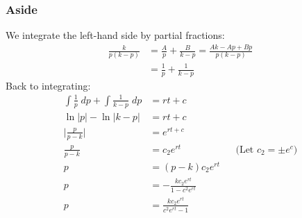 \documentclass{report}
\begin{document}
\subsubsection{Aside}
We integrate the left-hand side by partial fractions:
\begin{align*}
    \frac{k}{p(k-p)} &= \frac{A}{p} + \frac{B}{k-p} = \frac{Ak - Ap + Bp}{p(k-p)} \\
    &= \frac{1}{p} + \frac{1}{k-p}
\end{align*}
Back to integrating:
\begin{align}
    \int \frac{1}{p} \; dp + \int \frac{1}{k-p} \; dp &= rt + c \\
    \ln |p| - \ln |k - p| &= rt + c \\
    \biggl\lvert\frac{p}{p-k}\biggr\rvert &= e^{rt + c} \\
    \frac{p}{p-k} &= c_2e^{rt} && \text{(Let }c_2 = \pm e^c) \\
    p &= (p-k)c_2e^{rt} \\
    p &= - \frac{kc_2e^{rt}}{1 - c^2e^{rt}} \\
    p &= \frac{kc_2e^{rt}}{c^2e^{rt} - 1}
\end{align}

\end{document}
